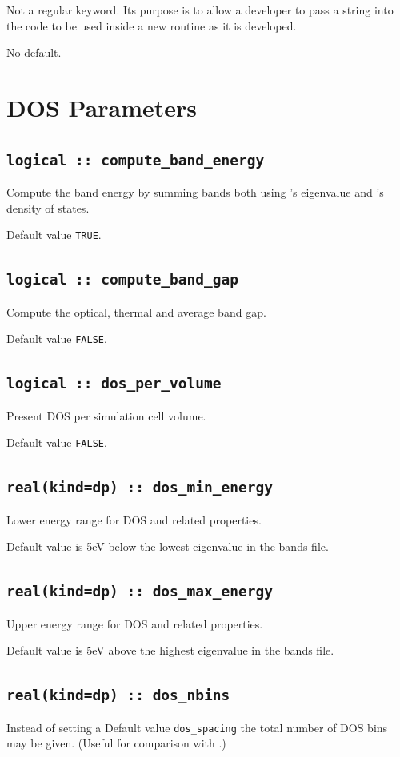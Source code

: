\documentclass[a4paper,11pt,twoside]{book}
\begin{document}
{Not a regular keyword. Its purpose is to allow a developer to pass a
string into the code to be used inside a new routine as it is developed.

No default.



\section{DOS Parameters}

\subsection[compute\_band\_energy]{\tt logical :: compute\_band\_energy}
Compute the band energy by summing bands both using \castep's eigenvalue and \optados's density of states.

Default value \verb#TRUE#.

\subsection[compute\_band\_energy]{\tt logical :: compute\_band\_gap}
Compute the optical, thermal and average band gap.

Default value \verb#FALSE#.

\subsection[DOS\_per\_volume]{\tt logical :: dos\_per\_volume}
Present DOS per simulation cell volume.

Default value \verb#FALSE#.

\subsection[dos\_min\_energy]{\tt real(kind=dp) :: dos\_min\_energy}
Lower energy range for DOS and related properties.

Default value is 5eV below the lowest eigenvalue in the bands file.

\subsection[dos\_max\_energy]{\tt real(kind=dp) :: dos\_max\_energy}
Upper energy range for DOS and related properties.

Default value is 5eV above the highest eigenvalue in the bands file.


\subsection[dos\_nbins]{\tt real(kind=dp) :: dos\_nbins}
Instead of setting a Default value \verb#dos_spacing# the total number of DOS bins may be given.  (Useful for comparison with \lindos.)

}
\end{document}
